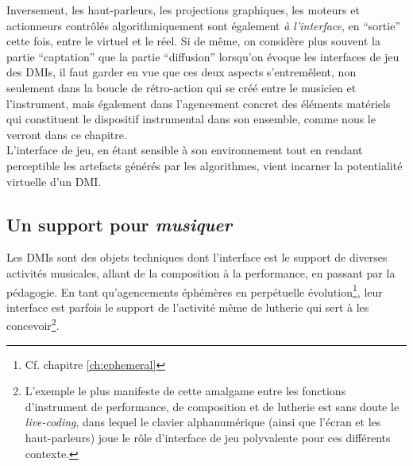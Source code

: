 \indent Inversement, les haut-parleurs, les projections graphiques, les moteurs et actionneurs contrôlés algorithmiquement sont également \textit{à l'interface}, en ``sortie'' cette fois, entre le virtuel et le réel. Si de même, on considère plus souvent la partie ``captation'' que la partie ``diffusion'' lorsqu'on évoque les interfaces de jeu des \glspl{DMI}, il faut garder en vue que ces deux aspects s'entremêlent, non seulement dans la boucle de rétro-action qui se créé entre le musicien et l'instrument, mais également dans l'agencement concret des éléments matériels qui constituent le dispositif instrumental dans son ensemble, comme nous le verront dans ce chapitre.\\
\indent L'interface de jeu, en étant sensible à son environnement tout en rendant perceptible les artefacts générés par les algorithmes, vient incarner la potentialité virtuelle d'un \gls{DMI}.


\subsection{Un support pour \textit{musiquer}}

\noindent Les \glspl{DMI} sont des objets techniques dont l'interface est le support de diverses activités musicales, allant de la composition à la performance, en passant par la pédagogie. En tant qu'agencements éphémères en perpétuelle évolution\footnote{Cf. chapitre \ref{ch:ephemeral}}, leur interface est parfois le support de l'activité même de lutherie qui sert à les concevoir\footnote{L'exemple le plus manifeste de cette amalgame entre les fonctions d'instrument de performance, de composition et de lutherie est sans doute le \textit{live-coding}, dans lequel le clavier alphanumérique (ainsi que l'écran et les haut-parleurs) joue le rôle d'interface de jeu polyvalente pour ces différents contexte.}.

